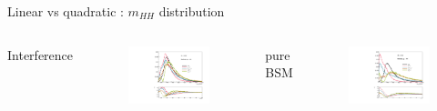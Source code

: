 \begin{frame}{Linear vs quadratic : $m_{HH}$ distribution}
\begin{columns}

Interference
\begin{figure}
    \centering
    \includegraphics[width=1.\textwidth]{Part5/Img/EFT_suplot.pdf}
\end{figure}
    

pure BSM
\begin{figure}
    \centering
    \includegraphics[width=1.\textwidth]{BackUp/Part5/Img/EFT_suplot_Quad.pdf}
\end{figure}

\end{columns}
\end{frame}

